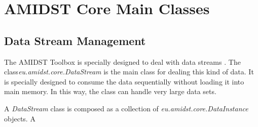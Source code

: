 \chapter{AMIDST Core Main Classes}\label{sec:codeExamples}

\section{Data Stream Management}

The AMIDST Toolbox is specially designed to deal with data streams \cite{Hulten2001}. The class\textit{eu.amidst.core.DataStream} is the main class for dealing this kind of data. It is specially designed to consume the data sequentially without loading it into main memory. In this way, the class can handle very large data sets. 

A \textit{DataStream} class is composed as a collection of \textit{eu.amidst.core.DataInstance} objects. A  




\begin{lstlisting}


\end{lstlisting}